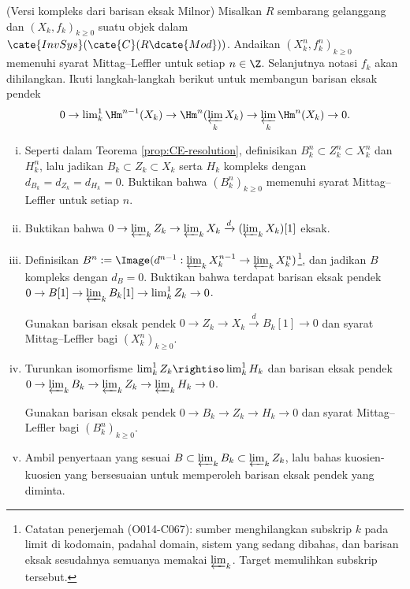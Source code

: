 \begin{Exercises}
	\item (Versi kompleks dari barisan eksak Milnor) Misalkan $R$ sembarang
	gelanggang dan $(X_k,f_k)_{k\geq0}$ suatu objek dalam
	$\cate{InvSys}(\cate{C}(R\dcate{Mod}))$. Andaikan
	$(X_k^n,f_k^n)_{k\geq0}$ memenuhi syarat Mittag--Leffler untuk setiap
	$n\in\Z$. Selanjutnya notasi $f_k$ akan dihilangkan. Ikuti langkah-langkah
	berikut untuk membangun barisan eksak pendek
	\[
		0\to\lim\nolimits^1_k\Hm^{n-1}(X_k)
		\to\Hm^n(\varprojlim_kX_k)
		\to\varprojlim_k\Hm^n(X_k)\to0.
	\]
	\begin{enumerate}[(i)]
		\item Seperti dalam Teorema \ref{prop:CE-resolution}, definisikan
		$B_k^n\subset Z_k^n\subset X_k^n$ dan $H_k^n$, lalu jadikan
		$B_k\subset Z_k\subset X_k$ serta $H_k$ kompleks dengan
		$d_{B_k}=d_{Z_k}=d_{H_k}=0$. Buktikan bahwa
		$(B_k^n)_{k\geq0}$ memenuhi syarat Mittag--Leffler untuk setiap $n$.
		\item Buktikan bahwa
		$0\to\varprojlim_kZ_k\to\varprojlim_kX_k
		\xrightarrow{d}(\varprojlim_kX_k)[1]$ eksak.
		\item Definisikan
		$B^n:=\Image(d^{n-1}:\varprojlim_kX_k^{n-1}\to
		\varprojlim_kX_k^n)$\footnote{Catatan penerjemah (O014-C067):
		sumber menghilangkan subskrip $k$ pada limit di kodomain, padahal
		domain, sistem yang sedang dibahas, dan barisan eksak sesudahnya
		semuanya memakai $\varprojlim_k$. Target memulihkan subskrip tersebut.},
		dan jadikan $B$ kompleks dengan $d_B=0$. Buktikan bahwa terdapat
		barisan eksak pendek
		$0\to B[1]\to\varprojlim_kB_k[1]\to\lim\nolimits^1_kZ_k\to0$.
		\begin{hint}
			Gunakan barisan eksak pendek
			$0\to Z_k\to X_k\xrightarrow{d}B_k[1]\to0$ dan syarat
			Mittag--Leffler bagi $(X_k^n)_{k\geq0}$.
		\end{hint}
		\item Turunkan isomorfisme
		$\lim\nolimits^1_kZ_k\rightiso\lim\nolimits^1_kH_k$ dan barisan eksak
		pendek
		$0\to\varprojlim_kB_k\to\varprojlim_kZ_k
		\to\varprojlim_kH_k\to0$.
		\begin{hint}
			Gunakan barisan eksak pendek
			$0\to B_k\to Z_k\to H_k\to0$ dan syarat Mittag--Leffler bagi
			$(B_k^n)_{k\geq0}$.
		\end{hint}
		\item Ambil penyertaan yang sesuai
		$B\subset\varprojlim_kB_k\subset\varprojlim_kZ_k$, lalu bahas
		kuosien-kuosien yang bersesuaian untuk memperoleh barisan eksak pendek
		yang diminta.
	\end{enumerate}


\end{Exercises}
